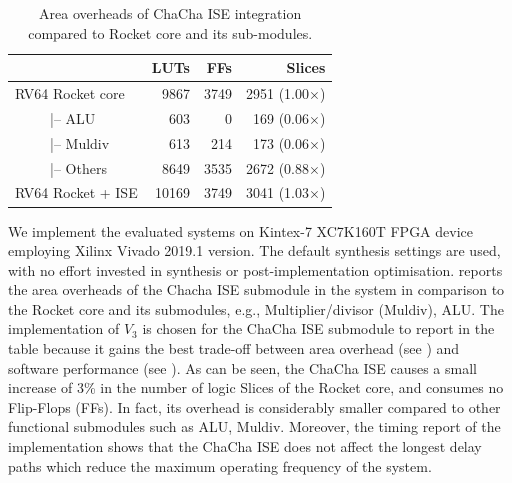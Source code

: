 \begin{table}
	\caption{Area overheads of ChaCha ISE integration compared to Rocket core and its sub-modules.}
	\label{tab:res:hardcost2}
    \centering
	\begin{tabular}{lrrr}
		\toprule            
		                 &     LUTs   &   FFs  &   Slices \\
		\midrule
		RV64 Rocket core  &    9867   &  3749  & 2951 (1.00$\times$)\\
		~~~~~|-- ALU      &     603   &     0  &  169 (0.06$\times$) \\
		~~~~~|-- Muldiv   &     613   &   214  &  173 (0.06$\times$)\\
		~~~~~|-- Others   &    8649   &  3535  & 2672 (0.88$\times$)\\
		RV64 Rocket + ISE &   10169   &  3749  & 3041 (1.03$\times$)\\ 
		
		\bottomrule
	\end{tabular} 
\end{table}

We implement the evaluated systems on Kintex-7 XC7K160T FPGA device employing Xilinx Vivado 2019.1 version. 
The default synthesis settings are used, with no effort invested in synthesis or post-implementation optimisation.
 reports the area overheads of the Chacha ISE submodule in the system in comparison to the Rocket core and its submodules, e.g., Multiplier/divisor (Muldiv), ALU. 
The implementation of $V_3$ is chosen for the ChaCha ISE submodule to report in the table because it gains the best trade-off between area overhead (see ) and software performance (see ). 
As can be seen, 
the ChaCha ISE causes a small increase of 3\% in the number of logic Slices of the Rocket core, and consumes no Flip-Flops (FFs). 
In fact, its overhead is considerably smaller compared to other functional submodules such as ALU, Muldiv. 
Moreover, the timing report of the implementation shows that the ChaCha ISE does not affect the longest delay paths which reduce the maximum operating frequency of the system.



